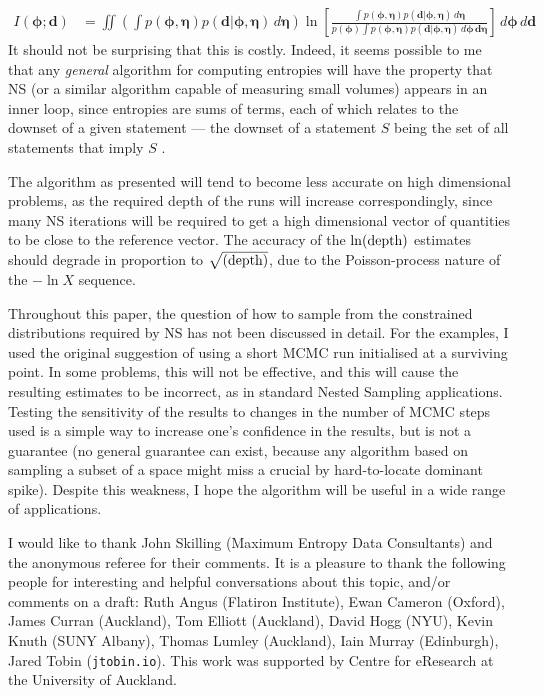 \documentclass[entropy,article,accept,oneauthor,pdftex,10pt,a4paper]{mdpi}
\newcommand{\revision}{\color{darkblue}}
\renewcommand{\d}{\boldsymbol{d}}
\newcommand{\bphi}{\boldsymbol{\phi}}
\newcommand{\boldeta}{\boldsymbol{\eta}}
\newcommand{\depth}{(\textnormal{depth})}
\begin{document}
\begin{align}
I(\bphi; \d) &= \iint
  \left(\int p(\bphi, \boldeta)p(\d | \bphi, \boldeta) \, d\boldeta\right)
                        \ln \left[
  \frac{\int p(\bphi, \boldeta)p(\d | \bphi, \boldeta) \, d\boldeta}
{p(\bphi)\int p(\bphi, \boldeta)p(\d | \bphi, \boldeta) \, d\bphi \, \d\boldeta}\right]
                        \, d\bphi \, d\d
\end{align}
It should not be surprising that this is costly. Indeed, it seems possible
to me that any {\em general} algorithm for computing entropies will have the
property that NS (or a similar algorithm capable of measuring small volumes)
appears in an inner loop, since entropies are sums of terms, each of which
relates to the downset of a given statement --- the downset of a statement
$S$ being the set of all statements that imply $S$ \citep{knuth_questions}.

The algorithm as presented will tend to become less accurate on high dimensional
problems, as the required depth of the runs will increase correspondingly,
since many NS iterations will be required to get a high dimensional vector
of quantities to be close to the reference vector.
The accuracy of the $\ln\depth$ estimates should degrade in proportion to
$\sqrt{\depth}$, due to the Poisson-process nature of the $-\ln X$ sequence.

Throughout this paper, the question of how to sample from the constrained
distributions required by NS has not been discussed in detail. For the examples,
I used the original \citet{skilling2006nested} suggestion of using a short MCMC run
initialised at a surviving point. In some problems, this will not be effective,
and this will cause the resulting estimates to be incorrect, as in standard
Nested Sampling applications. Testing the sensitivity of the results to
changes in the number of MCMC steps used is a simple way to increase one's
confidence in the results, but is not a guarantee {\revision (no general guarantee can
exist, because any algorithm based on sampling a subset of a space might miss
a crucial by hard-to-locate dominant spike)}.
Despite this weakness, I hope the algorithm will be
useful in a wide range of applications.

{\revision I would like to thank John Skilling
(Maximum Entropy Data Consultants) and the
anonymous referee for their comments.}
It is a pleasure to thank the following people for interesting and helpful
conversations about this topic, and/or comments on a draft:
Ruth Angus (Flatiron Institute),
Ewan Cameron (Oxford), James Curran (Auckland), Tom Elliott (Auckland),
David Hogg (NYU), Kevin Knuth (SUNY Albany),
Thomas Lumley (Auckland),
Iain Murray (Edinburgh), Jared Tobin ({\tt jtobin.io}).
This work was supported by Centre for eResearch
at the University of Auckland.
\end{document}

